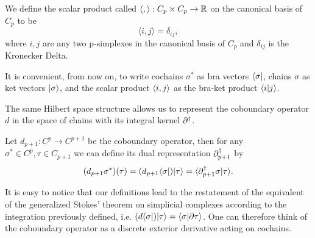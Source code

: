 \documentclass[../1.tex]{subfiles}
\begin{document}
    \begin{defn}
        We define the scalar product called  $\langle, \rangle : C_p \times C_p \to \mathbb{R}$ on the canonical basis of $C_p$ to be 
        \[ \langle i, j \rangle = \delta_{ij} ,\] 
        where $i,j$ are any two p-simplexes in the canonical basis of $C_p$ and $\delta_{ij}$ is the Kronecker Delta.
    \end{defn}
    It is convenient, from now on,  to write cochains $\sigma^*$ as bra vectors $\langle \sigma |$, chains $\sigma$ as ket vectors $| \sigma \rangle$,
    and the scalar product $\langle i, j \rangle$ as the bra-ket product $\langle i | j \rangle$.

    The same Hilbert space structure allows us to represent the coboundary operator $d$ in the space of chains with its integral kernel $\partial^\dagger$.

    \begin{defn}
        Let $d_{p+1} : C^p \to C^{p+1}$ be the coboundary operator, then for any $\sigma^* \in C^p, \tau \in C_{p+1}$ we can define its dual representation $\partial^\dagger_{p+1}$ by
        \[ (d_{p+1} \sigma^*)(\tau) = (d_{p+1} \langle \sigma |)| \tau \rangle = \langle \partial^\dagger_{p+1} \sigma | \tau \rangle. \]
    \end{defn}

    It is easy to notice that our definitions lead to the restatement of the equivalent of the generalized Stokes' theorem on simplicial complexes
    according to the integration previously defined, i.e. $(d\langle \sigma |)| \tau \rangle = \langle \sigma | \partial\tau \rangle$. One can therefore think of the coboundary
    operator as a discrete exterior derivative acting on cochains.
   
\end{document}
